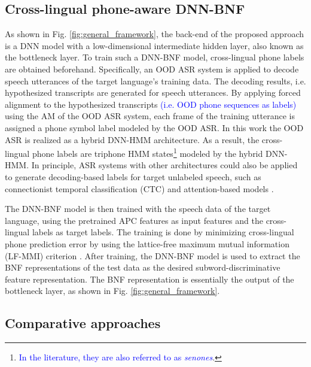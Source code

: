 \documentclass[transmag]{IEEEtran}
\begin{document}
\subsection{Cross-lingual phone-aware DNN-BNF}
\label{subsec:approach_crs_ling_bnf}
As shown in Fig. \ref{fig:general_framework}, the back-end of the proposed approach is a DNN model with a low-dimensional intermediate hidden layer, also known as the bottleneck layer. To train such a DNN-BNF model, cross-lingual phone labels are obtained beforehand. Specifically, an OOD ASR system is applied to decode speech utterances of the target language’s training data. 
The decoding results, i.e. hypothesized transcripts are generated for speech utterances. 
By applying forced alignment to the hypothesized transcripts \textcolor{blue}{(i.e. OOD phone sequences as labels)} using the AM of the OOD ASR system, each frame of the training utterance is assigned a phone symbol label modeled by the OOD ASR.
In this work the OOD ASR is realized as a hybrid DNN-HMM architecture. 
As a result, the cross-lingual phone labels are triphone HMM states\footnote{\textcolor{blue}{In the literature, they are also   referred to as \textit{senones}}.} modeled by the hybrid DNN-HMM. In principle, ASR systems with other architectures could also be applied to generate decoding-based labels for target unlabeled speech, such as connectionist temporal classification (CTC)  \cite{graves2014towards} and attention-based models \cite{chan2016listen}.

The DNN-BNF model is then trained with the speech data of the target language, using the pretrained APC features as input features and the cross-lingual labels as target labels. The training is done by minimizing cross-lingual phone prediction error by using the lattice-free maximum mutual information (LF-MMI) criterion \cite{povey2016purely}. 
After training, the DNN-BNF model is used to extract the BNF representations of the test data as the desired subword-discriminative feature representation. The BNF representation is essentially the output of the bottleneck layer, as shown in Fig. \ref{fig:general_framework}.

\subsection{Comparative approaches}
\label{subsec:approach_comparative_approaches}
\end{document}
